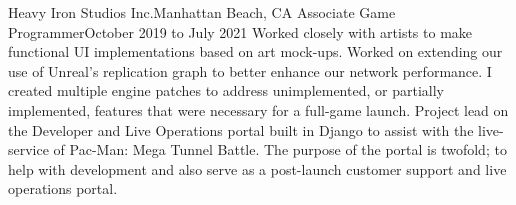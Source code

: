 

\experienceHeading
{Heavy Iron Studios Inc.}{Manhattan Beach, CA}
{Associate Game Programmer}{October 2019 to July 2021}
\experienceStart
        {Worked closely with artists to make functional UI implementations based on art mock-ups.}
        {Worked on extending our use of Unreal's replication graph to better enhance our network performance.}
        {I created multiple engine patches to address unimplemented, or partially implemented, features that were necessary for a full-game launch.}
        {Project lead on the Developer and Live Operations portal built in Django to assist with the live-service of Pac-Man: Mega Tunnel Battle. The purpose of the portal is twofold; to help with development and also serve as a post-launch customer support and live operations portal.}
\experienceEnd